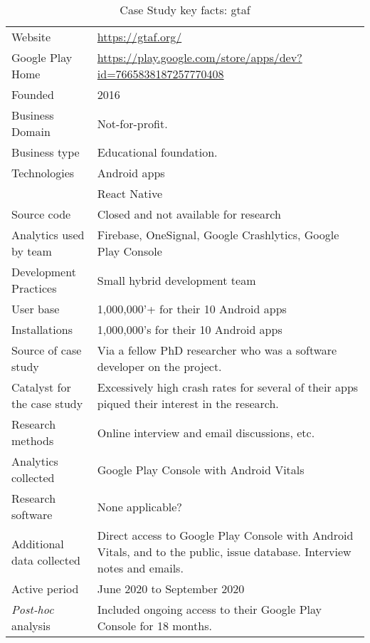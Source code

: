 {\renewcommand{\arraystretch}{0.8}%
\begin{table*}[h]
    
    \centering
    \small
    \setlength{\tabcolsep}{6pt}
    \begin{tabular}{lp{11cm}}
       \toprule
       Website &\url{https://gtaf.org/} \\
       Google Play Home & \url{https://play.google.com/store/apps/dev?id=7665838187257770408} \\
       Founded & 2016 \\
       Business Domain & Not-for-profit.  \\
       Business type & Educational foundation. \\
       Technologies  & Android apps\footnotemark \\
       & React Native \\
       Source code  & Closed and not available for research \\
       Analytics used by team & Firebase, OneSignal, Google Crashlytics, Google Play Console \\
       Development Practices & Small hybrid development team \\
       \midrule
       User base & 1,000,000'+ for their 10 Android apps \\
       Installations & 1,000,000's for their 10 Android apps \\
       \midrule
       Source of case study &Via a fellow PhD researcher who was a software developer on the project. \\
       Catalyst for the case study &Excessively high crash rates for several of their apps piqued their interest in the research. \\
       \midrule
       Research methods &Online interview and email discussions, etc. \\
       Analytics collected &Google Play Console with Android Vitals \\
       Research software & None applicable? \\
       Additional data collected &Direct access to Google Play Console with Android Vitals, and to the public, issue database. Interview notes and emails. \\
       Active period & June 2020 to September 2020 \\
       \midrule
       \emph{Post-hoc} analysis &Included ongoing access to their Google Play Console for 18 months. \\
       \bottomrule
    \end{tabular}
    \caption{Case Study key facts: \acrshort{gtaf}}
    \label{tab:gtaf_anaytics_overview}
\end{table*}
}

